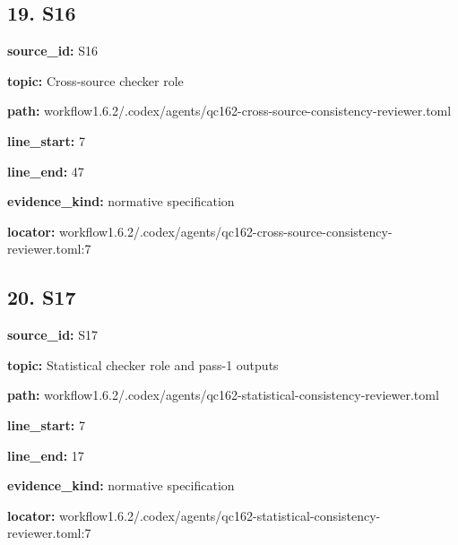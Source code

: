\documentclass[10pt,a4paper]{article}
\begin{document}
\subsection*{19.\allowbreak{} S16}
\textbf{source\_\allowbreak{}id:} S16\par
\textbf{topic:} Cross-\allowbreak{}source checker role\par
\textbf{path:} workflow1.\allowbreak{}6.\allowbreak{}2/\allowbreak{}.\allowbreak{}codex/\allowbreak{}agents/\allowbreak{}qc162-\allowbreak{}cross-\allowbreak{}source-\allowbreak{}consistency-\allowbreak{}reviewer.\allowbreak{}toml\par
\textbf{line\_\allowbreak{}start:} 7\par
\textbf{line\_\allowbreak{}end:} 47\par
\textbf{evidence\_\allowbreak{}kind:} normative specification\par
\textbf{locator:} workflow1.\allowbreak{}6.\allowbreak{}2/\allowbreak{}.\allowbreak{}codex/\allowbreak{}agents/\allowbreak{}qc162-\allowbreak{}cross-\allowbreak{}source-\allowbreak{}consistency-\allowbreak{}reviewer.\allowbreak{}toml:7\par
\subsection*{20.\allowbreak{} S17}
\textbf{source\_\allowbreak{}id:} S17\par
\textbf{topic:} Statistical checker role and pass-\allowbreak{}1 outputs\par
\textbf{path:} workflow1.\allowbreak{}6.\allowbreak{}2/\allowbreak{}.\allowbreak{}codex/\allowbreak{}agents/\allowbreak{}qc162-\allowbreak{}statistical-\allowbreak{}consistency-\allowbreak{}reviewer.\allowbreak{}toml\par
\textbf{line\_\allowbreak{}start:} 7\par
\textbf{line\_\allowbreak{}end:} 17\par
\textbf{evidence\_\allowbreak{}kind:} normative specification\par
\textbf{locator:} workflow1.\allowbreak{}6.\allowbreak{}2/\allowbreak{}.\allowbreak{}codex/\allowbreak{}agents/\allowbreak{}qc162-\allowbreak{}statistical-\allowbreak{}consistency-\allowbreak{}reviewer.\allowbreak{}toml:7\par
\end{document}
